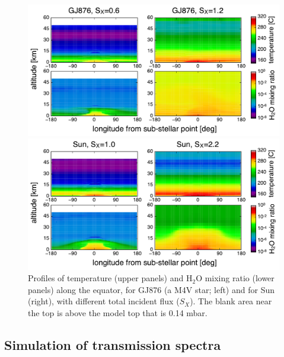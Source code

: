 \documentclass[11pt,numberedappendix,twocolappendix,]{emulateapj}
\def\water{H$_2$O }
\begin{document}
\begin{figure}[tb]
    \begin{minipage}{0.5\hsize}
\includegraphics[width=\hsize]{fig/AqOH0TLS_GJ876_temp_xH2O.pdf}
    \end{minipage}
    \begin{minipage}{0.5\hsize}
\includegraphics[width=\hsize]{fig/AqOH0TLS_Sun_temp_xH2O.pdf}
    \end{minipage}
    \caption{Profiles of temperature (upper panels) and \water mixing ratio (lower panels) along the equator, for GJ876 (a M4V star; left) and for Sun (right), with different total incident flux ($S_X$). The blank area near the top is above the model top that is  0.14 mbar. }
\label{fig:3Dprofile_equator}
\end{figure}


\subsection{Simulation of transmission spectra}
\end{document}
